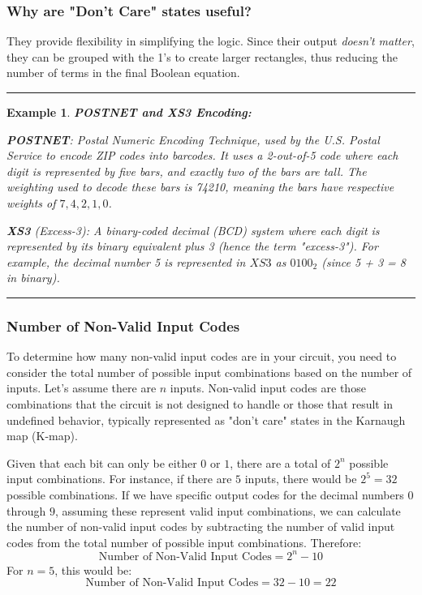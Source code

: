 \documentclass[12pt]{article}
\newtheorem{example}{Example}
\newenvironment{examp}
{\vspace{0.5cm}
\hrule
\begin{example}}
{\hrule
\vspace{0.5cm}
\end{example}}
\begin{document}
\subsubsection*{Why are "Don’t Care" states useful?}
They provide flexibility in simplifying the logic. Since their output \textit{doesn't
	matter}, they can be grouped with the 1’s to create larger rectangles, thus
reducing the number of terms in the final Boolean equation.
\begin{examp}
	\textbf{POSTNET and XS3 Encoding:}
	\begin{list}{-}{\leftmargin=1em \itemindent=0em}
		\item \textbf{POSTNET}: Postal Numeric Encoding Technique, used by the
		      U.S. Postal Service to encode ZIP codes into barcodes. It uses a
		      2-out-of-5 code where each digit is represented by five bars, and
		      exactly two of the bars are tall. The weighting used to decode
		      these bars is 74210, meaning the bars have respective weights of
		      \(7, 4, 2, 1, 0\).
		\item \textbf{XS3} (Excess-3): A binary-coded
		      decimal (BCD) system where each digit is represented by its binary
		      equivalent plus 3 (hence the term "excess-3"). For example, the
		      decimal number 5 is represented in \(XS3\) as \(0100_2\) (since 5 +
		      3 = 8 in binary).
	\end{list}
\end{examp}

\subsubsection*{Number of Non-Valid Input Codes}

To determine how many non-valid input codes are in your circuit, you need to
consider the total number of possible input combinations based on the number of
inputs. Let’s assume there are \(n\) inputs. Non-valid input codes are those combinations
that the circuit is not designed to handle or those that result in undefined behavior,
typically represented as "don't care" states in the Karnaugh map (K-map).

Given that each bit can only be either \(0\) or \(1\), there are a total of \(2^n\) possible input combinations.
For instance, if there are \(5\) inputs, there would be \(2^5 = 32\) possible combinations.
If we have specific output codes for the decimal numbers \(0\) through \(9\),
assuming these represent valid input combinations, we can calculate the number of non-valid input codes by subtracting the number of valid input codes from the total number of possible input combinations. Therefore:
\[
	\text{Number of Non-Valid Input Codes} = 2^n - 10
\]
For \(n = 5\), this would be:
\[
	\text{Number of Non-Valid Input Codes} = 32 - 10 = 22
\]
\end{document}
